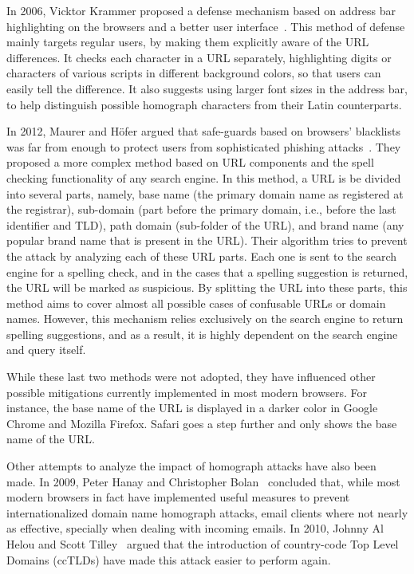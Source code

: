 \documentclass[letterpaper,twocolumn,10pt]{article}
\begin{document}
In 2006, Vicktor Krammer proposed a defense mechanism based on address bar highlighting on the browsers and a better user interface~\cite{krammer2006}.
This method of defense mainly targets regular users, by making them explicitly aware of the URL differences.
It checks each character in a URL separately, highlighting digits or characters of various scripts in different background colors, so that users can easily tell the difference.
It also suggests using larger font sizes in the address bar, to help distinguish possible homograph characters from their Latin counterparts.

In 2012, Maurer and H\"{o}fer argued that safe-guards based on browsers' blacklists was far from enough to protect users from sophisticated phishing attacks~\cite{maurer2012}.
They proposed a more complex method based on URL components and the spell checking functionality of any search engine.
In this method, a URL is be divided into several parts, namely, base name (the primary domain name as registered at the registrar), sub-domain (part before the primary domain, i.e., before the last identifier and TLD), path domain (sub-folder of the URL), and brand name (any popular brand name that is present in the URL).
Their algorithm tries to prevent the attack by analyzing each of these URL parts.
Each one is sent to the search engine for a spelling check, and in the cases that a spelling suggestion is returned, the URL will be marked as suspicious.
By splitting the URL into these parts, this method aims to cover almost all possible cases of confusable URLs or domain names.
However, this mechanism relies exclusively on the search engine to return spelling suggestions, and as a result, it is highly dependent on the search engine and query itself.

While these last two methods were not adopted, they have influenced other possible mitigations currently implemented in most modern browsers.
For instance, the base name of the URL is displayed in a darker color in Google Chrome and Mozilla Firefox.
Safari goes a step further and only shows the base name of the URL.

Other attempts to analyze the impact of homograph attacks have also been made.
In 2009, Peter Hanay and Christopher Bolan~\cite{hannay2009} concluded that, while most modern browsers in fact have implemented useful measures to prevent internationalized domain name homograph attacks, email clients where not nearly as effective, specially when dealing with incoming emails.
In 2010, Johnny Al Helou and Scott Tilley~\cite{al2010} argued that the introduction of country-code Top Level Domains (ccTLDs) have made this attack easier to perform again.
\end{document}
